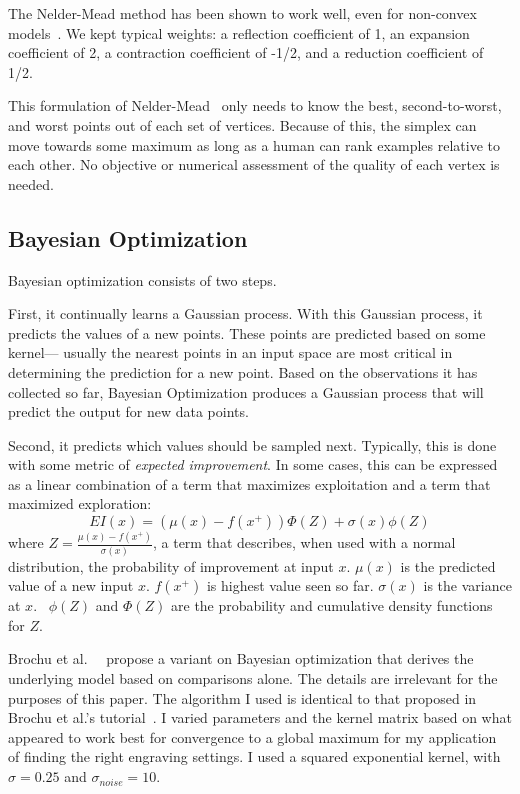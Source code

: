 The Nelder-Mead method has been shown to work well, even for non-convex models~.
We kept typical weights: a reflection coefficient of 1, an expansion coefficient of 2, a contraction coefficient of -1/2, and a reduction coefficient of 1/2.

This formulation of Nelder-Mead~ only needs to know the best, second-to-worst, and worst points out of each set of vertices.
Because of this, the simplex can move towards some maximum as long as a human can rank examples relative to each other.
No objective or numerical assessment of the quality of each vertex is needed.

\subsection{Bayesian Optimization}

Bayesian optimization consists of two steps.

First, it continually learns a Gaussian process.
With this Gaussian process, it predicts the values of a new points.
These points are predicted based on some kernel---
usually the nearest points in an input space are most critical in determining the prediction for a new point.
Based on the observations it has collected so far, Bayesian Optimization produces a Gaussian process that will predict the output for new data points.

Second, it predicts which values should be sampled next.
Typically, this is done with some metric of \emph{expected improvement}.
In some cases, this can be expressed as a linear combination of a term that maximizes exploitation and a term that maximized exploration:
\begin{equation}
EI (x) = (\mu(x) - f (x^+)) \Phi(Z) + \sigma(x) \phi(Z)
\end{equation}
where $Z = \frac{\mu(x) - f(x^+)}{\sigma(x)}$, a term that describes, when used with a normal distribution, the probability of improvement at input $x$.
$\mu(x)$ is the predicted value of a new input $x$.
$f(x^+)$ is highest value seen so far.
$\sigma(x)$ is the variance at $x$.~
$\phi(Z)$ and $\Phi(Z)$ are the probability and cumulative density functions for $Z$.

Brochu et al.~\cite{brochu_tutorial_2010}~\cite{brochu_active_2008} propose a variant on Bayesian optimization that derives the underlying model based on comparisons alone.
The details are irrelevant for the purposes of this paper.
The algorithm I used is identical to that proposed in Brochu et al.'s tutorial~\cite{brochu_tutorial_2010}.
I varied parameters and the kernel matrix based on what appeared to work best for convergence to a global maximum for my application of finding the right engraving settings.
I used a squared exponential kernel, with $\sigma = 0.25$ and $\sigma_{noise} = 10$.
